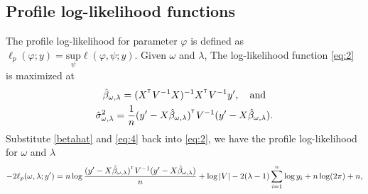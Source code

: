 \documentclass{article}\usepackage[]{graphicx}\usepackage[]{color}
\def\T{{\footnotesize {^{_{\sf T}}}}}
\begin{document}
\subsection{Profile log-likelihood functions}
The profile log-likelihood for parameter $\varphi$ is defined as $\ell_p(\varphi;y) = \underset{\psi}{\text{sup}} \ell (\varphi, \psi; y ).$ Given $\omega$ and $\lambda$, The log-likelihood function \eqref{eq:2} is maximized at
%
\begin{gather}
\hat{\beta}_{\omega,\lambda}=(X^\T V^{-1}X)^{-1} X^\T V^{-1}y', \quad \text{and} \label{betahat}\\
\hat{{\sigma}}^2_{\omega,\lambda}= \frac{1}{n}(y'-X\hat{\beta}_{\omega,\lambda})^\T V^{-1}(y'-X\hat{\beta}_{\omega,\lambda}) \label{eq:4}.
\end{gather}
%
Substitute \eqref{betahat} and \eqref{eq:4} back into \eqref{eq:2}, we have the profile log-likelihood for $\omega$ and $\lambda$
%
\begin{equation} \label{profile}
-2\ell_p(\omega, \lambda;y')=n \log\frac{(y'-X\hat{\beta}_{\omega,\lambda})^\T V^{-1}(y'-X\hat{\beta}_{\omega,\lambda})}{n}+\log|V| -2(\lambda-1)\sum_{i=1}^{n}\log y_i + n\log(2\pi) + n,
\end{equation}
%
\end{document}
